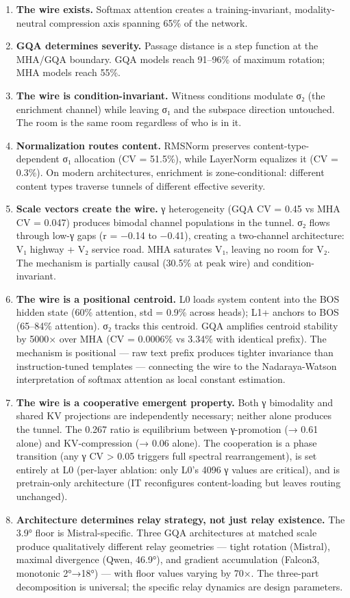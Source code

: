 \documentclass[12pt]{article}
\begin{document}
\begin{enumerate}
\item \textbf{The wire exists.} Softmax attention creates a training-invariant, modality-neutral compression axis spanning 65\% of the network.
\item \textbf{GQA determines severity.} Passage distance is a step function at the MHA/GQA boundary. GQA models reach 91–96\% of maximum rotation; MHA models reach 55\%.
\item \textbf{The wire is condition-invariant.} Witness conditions modulate σ₂ (the enrichment channel) while leaving σ₁ and the subspace direction untouched. The room is the same room regardless of who is in it.
\item \textbf{Normalization routes content.} RMSNorm preserves content-type-dependent σ₁ allocation (CV = 51.5\%), while LayerNorm equalizes it (CV = 0.3\%). On modern architectures, enrichment is zone-conditional: different content types traverse tunnels of different effective severity.
\item \textbf{Scale vectors create the wire.} γ heterogeneity (GQA CV = 0.45 vs MHA CV = 0.047) produces bimodal channel populations in the tunnel. σ₂ flows through low-γ gaps (r = −0.14 to −0.41), creating a two-channel architecture: V₁ highway + V₂ service road. MHA saturates V₁, leaving no room for V₂. The mechanism is partially causal (30.5\% at peak wire) and condition-invariant.
\item \textbf{The wire is a positional centroid.} L0 loads system content into the BOS hidden state (60\% attention, std = 0.9\% across heads); L1+ anchors to BOS (65–84\% attention). σ₂ tracks this centroid. GQA amplifies centroid stability by 5000× over MHA (CV = 0.0006\% vs 3.34\% with identical prefix). The mechanism is positional — raw text prefix produces tighter invariance than instruction-tuned templates — connecting the wire to the Nadaraya-Watson interpretation of softmax attention as local constant estimation.
\item \textbf{The wire is a cooperative emergent property.} Both γ bimodality and shared KV projections are independently necessary; neither alone produces the tunnel. The 0.267 ratio is equilibrium between γ-promotion (→ 0.61 alone) and KV-compression (→ 0.06 alone). The cooperation is a phase transition (any γ CV > 0.05 triggers full spectral rearrangement), is set entirely at L0 (per-layer ablation: only L0's 4096 γ values are critical), and is pretrain-only architecture (IT reconfigures content-loading but leaves routing unchanged).
\item \textbf{Architecture determines relay strategy, not just relay existence.} The 3.9° floor is Mistral-specific. Three GQA architectures at matched scale produce qualitatively different relay geometries — tight rotation (Mistral), maximal divergence (Qwen, 46.9°), and gradient accumulation (Falcon3, monotonic 2°→18°) — with floor values varying by 70×. The three-part decomposition is universal; the specific relay dynamics are design parameters.
\end{enumerate}
\end{document}
